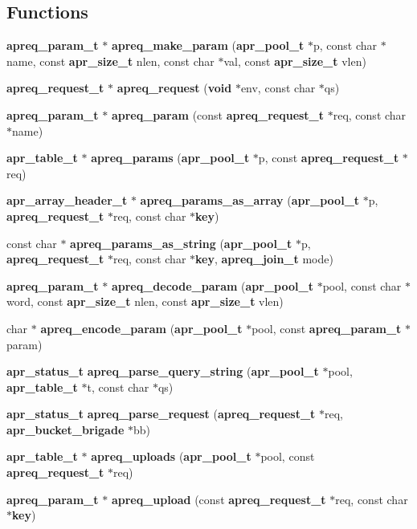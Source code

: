 \subsection*{Functions}
\begin{CompactItemize}
\item 
{\bf apreq\_\-param\_\-t} $\ast$ {\bf apreq\_\-make\_\-param} ({\bf apr\_\-pool\_\-t} $\ast$p, const char $\ast$name, const {\bf apr\_\-size\_\-t} nlen, const char $\ast$val, const {\bf apr\_\-size\_\-t} vlen)
\item 
{\bf apreq\_\-request\_\-t} $\ast$ {\bf apreq\_\-request} ({\bf void} $\ast$env, const char $\ast$qs)
\item 
{\bf apreq\_\-param\_\-t} $\ast$ {\bf apreq\_\-param} (const {\bf apreq\_\-request\_\-t} $\ast$req, const char $\ast$name)
\item 
{\bf apr\_\-table\_\-t} $\ast$ {\bf apreq\_\-params} ({\bf apr\_\-pool\_\-t} $\ast$p, const {\bf apreq\_\-request\_\-t} $\ast$req)
\item 
{\bf apr\_\-array\_\-header\_\-t} $\ast$ {\bf apreq\_\-params\_\-as\_\-array} ({\bf apr\_\-pool\_\-t} $\ast$p, {\bf apreq\_\-request\_\-t} $\ast$req, const char $\ast${\bf key})
\item 
const char $\ast$ {\bf apreq\_\-params\_\-as\_\-string} ({\bf apr\_\-pool\_\-t} $\ast$p, {\bf apreq\_\-request\_\-t} $\ast$req, const char $\ast${\bf key}, {\bf apreq\_\-join\_\-t} mode)
\item 
{\bf apreq\_\-param\_\-t} $\ast$ {\bf apreq\_\-decode\_\-param} ({\bf apr\_\-pool\_\-t} $\ast$pool, const char $\ast$word, const {\bf apr\_\-size\_\-t} nlen, const {\bf apr\_\-size\_\-t} vlen)
\item 
char $\ast$ {\bf apreq\_\-encode\_\-param} ({\bf apr\_\-pool\_\-t} $\ast$pool, const {\bf apreq\_\-param\_\-t} $\ast$param)
\item 
{\bf apr\_\-status\_\-t} {\bf apreq\_\-parse\_\-query\_\-string} ({\bf apr\_\-pool\_\-t} $\ast$pool, {\bf apr\_\-table\_\-t} $\ast$t, const char $\ast$qs)
\item 
{\bf apr\_\-status\_\-t} {\bf apreq\_\-parse\_\-request} ({\bf apreq\_\-request\_\-t} $\ast$req, {\bf apr\_\-bucket\_\-brigade} $\ast$bb)
\item 
{\bf apr\_\-table\_\-t} $\ast$ {\bf apreq\_\-uploads} ({\bf apr\_\-pool\_\-t} $\ast$pool, const {\bf apreq\_\-request\_\-t} $\ast$req)
\item 
{\bf apreq\_\-param\_\-t} $\ast$ {\bf apreq\_\-upload} (const {\bf apreq\_\-request\_\-t} $\ast$req, const char $\ast${\bf key})

\end{CompactItemize}
